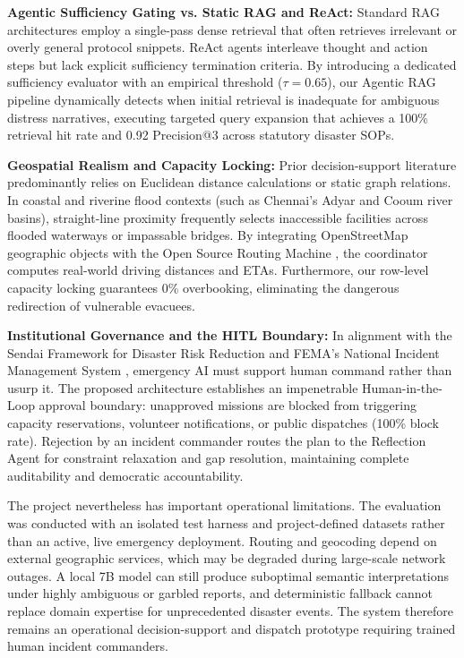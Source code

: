 \documentclass[conference]{IEEEtran}
\begin{document}
\textbf{Agentic Sufficiency Gating vs. Static RAG and ReAct:} Standard RAG architectures \cite{b4} employ a single-pass dense retrieval that often retrieves irrelevant or overly general protocol snippets. ReAct agents \cite{b5} interleave thought and action steps but lack explicit sufficiency termination criteria. By introducing a dedicated sufficiency evaluator with an empirical threshold ($\tau = 0.65$), our Agentic RAG pipeline dynamically detects when initial retrieval is inadequate for ambiguous distress narratives, executing targeted query expansion that achieves a 100\% retrieval hit rate and 0.92 Precision@3 across statutory disaster SOPs.

\textbf{Geospatial Realism and Capacity Locking:} Prior decision-support literature \cite{b15} predominantly relies on Euclidean distance calculations or static graph relations. In coastal and riverine flood contexts (such as Chennai's Adyar and Cooum river basins), straight-line proximity frequently selects inaccessible facilities across flooded waterways or impassable bridges. By integrating OpenStreetMap geographic objects \cite{b9} with the Open Source Routing Machine \cite{b10}, the coordinator computes real-world driving distances and ETAs. Furthermore, our row-level capacity locking guarantees 0\% overbooking, eliminating the dangerous redirection of vulnerable evacuees.

\textbf{Institutional Governance and the HITL Boundary:} In alignment with the Sendai Framework for Disaster Risk Reduction \cite{b12} and FEMA's National Incident Management System \cite{b13}, emergency AI must support human command rather than usurp it. The proposed architecture establishes an impenetrable Human-in-the-Loop approval boundary: unapproved missions are blocked from triggering capacity reservations, volunteer notifications, or public dispatches (100\% block rate). Rejection by an incident commander routes the plan to the Reflection Agent for constraint relaxation and gap resolution, maintaining complete auditability and democratic accountability.

The project nevertheless has important operational limitations. The evaluation was conducted with an isolated test harness and project-defined datasets rather than an active, live emergency deployment. Routing and geocoding depend on external geographic services, which may be degraded during large-scale network outages. A local 7B model can still produce suboptimal semantic interpretations under highly ambiguous or garbled reports, and deterministic fallback cannot replace domain expertise for unprecedented disaster events. The system therefore remains an operational decision-support and dispatch prototype requiring trained human incident commanders.
\end{document}

